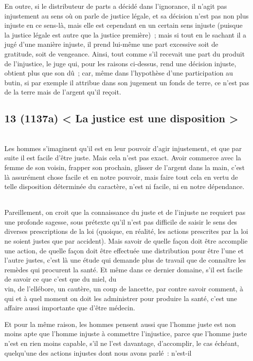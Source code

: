 \documentclass[french,twoside]{book} %
\begin{document}
En outre, si le distributeur de parts a décidé dans l’ignorance, il n’agit pas injustement au sens où on parle de justice légale, et sa décision n’est pas non plus injuste en ce sens-là, mais elle est cependant en un certain sens injuste (puisque la justice légale est autre que la justice première) ; mais si tout en le sachant il a jugé d’une manière injuste,  il prend lui-même une part excessive soit de gratitude, soit de vengeance. Ainsi, tout comme s’il recevait une part du produit de l’injustice, le juge qui, pour les raisons ci-dessus, rend une décision injuste, obtient plus que son dû ; car, même dans l’hypothèse d’une participation au butin, si par exemple il attribue dans son jugement un fonds de terre, ce n’est pas de la terre mais de l’argent qu’il reçoit.
\subsection[{13 (1137a) < La justice est une disposition >}]{13 (1137a) < La justice est une disposition >}
\noindent \\
Les hommes s’imaginent qu’il est en leur pouvoir d’agir injustement, et que par suite il est facile d’être juste. Mais cela n’est pas exact. Avoir commerce avec la femme de son voisin, frapper son prochain, glisser de l’argent dans la main, c’est là assurément chose facile et en notre pouvoir, mais faire tout cela en vertu de telle disposition déterminée du caractère, n’est ni facile, ni en notre dépendance.\par
\\
Pareillement, on croit que la connaissance du juste et de l’injuste ne requiert pas une profonde sagesse, sous prétexte qu’il n’est pas difficile de saisir le sens des diverses prescriptions de la loi (quoique, en réalité, les actions prescrites par la loi ne soient justes que par accident). Mais savoir de quelle façon doit être accomplie une action, de quelle façon doit être effectuée une distribution pour être l’une et l’autre justes, c’est là une étude qui demande plus de travail que de connaître les remèdes qui procurent la santé. Et même dans ce dernier domaine, s’il est facile de savoir ce que c’est que du miel, du \\
vin, de l’ellébore, un cautère, un coup de lancette, par contre savoir comment, à qui et à quel moment on doit les administrer pour produire la santé, c’est une affaire aussi importante que d’être médecin.\par
Et pour la même raison, les hommes pensent aussi que l’homme juste est non moins apte que l’homme injuste à commettre l’injustice, parce que l’homme juste n’est en rien moins capable, s’il ne l’est davantage, d’accomplir, le cas échéant, quelqu’une des actions injustes dont nous avons parlé : n’est-il \\
\end{document}
